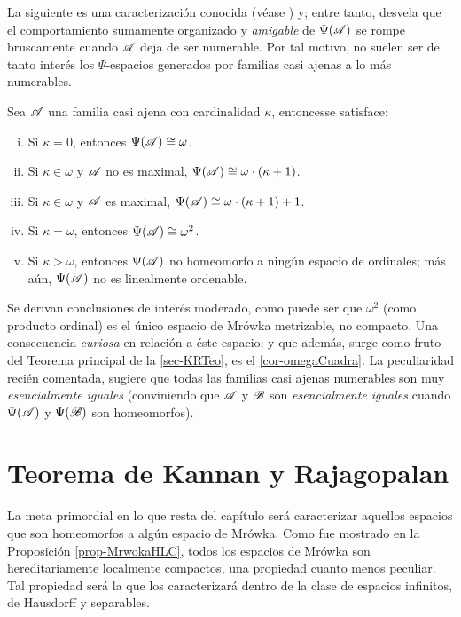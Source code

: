  La siguiente es una caracterización conocida (véase \cite[p.~39,45]{GeorginaTesis}) y; entre tanto, desvela que el comportamiento sumamente organizado y \textit{amigable} de $\Psi(\mathscr{A})$ se rompe bruscamente cuando $\mathscr{A}$ deja de ser numerable. Por tal motivo, no suelen ser de tanto interés los $\Psi$-espacios generados por familias casi ajenas a lo más numerables.

 \begin{proposicion}\label{prop-alomasNumCaract}
  Sea $\mathscr{A}$ una familia casi ajena con cardinalidad $\kappa$, entonces\footnotemark se satisface:
  \begin{enumerate}[i)]
   \item Si $\kappa=0$, entonces $\Psi(\mathscr{A}) \cong \omega$.
   \item Si $\kappa \in \omega$ y $\mathscr{A}$ no es maximal, $\Psi(\mathscr{A}) \cong \omega \cdot (\kappa+1)$.
   \item Si $\kappa \in \omega$ y $\mathscr{A}$ es maximal, $\Psi(\mathscr{A}) \cong \omega \cdot (\kappa+1)+1$.
   \item Si $\kappa=\omega$, entonces $\Psi(\mathscr{A}) \cong \omega^2$.
   \item Si $\kappa>\omega$, entonces $\Psi(\mathscr{A})$ no homeomorfo a ningún espacio de ordinales; más aún, $\Psi(\mathscr{A})$ no es linealmente ordenable.
  \end{enumerate}
 \end{proposicion}

 
 Se derivan conclusiones de interés moderado, como puede ser que $\omega^2$ (como producto ordinal) es el único espacio de Mrówka metrizable, no compacto. Una consecuencia \textit{curiosa} en relación a éste espacio; y que además, surge como fruto del Teorema principal de la \autoref{sec-KRTeo}, es el \autoref{cor-omegaCuadra}.
 \label{Dif-esencial}
 La peculiaridad recién comentada, sugiere que todas las familias casi ajenas numerables son muy \textit{esencialmente iguales} (conviniendo que $\mathscr{A}$ y $\mathscr{B}$ son \textit{esencialmente iguales} cuando $\Psi(\mathscr{A})$ y $\Psi(\mathscr{B})$ son homeomorfos).

 \section{Teorema de Kannan y Rajagopalan}
 \label{sec-KRTeo}
 La meta primordial en lo que resta del capítulo será caracterizar aquellos espacios que son homeomorfos a algún espacio de Mrówka. Como fue mostrado en la Proposición \ref{prop-MrwokaHLC}, todos los espacios de Mrówka son hereditariamente localmente compactos, una propiedad cuanto menos peculiar. Tal propiedad será la que los caracterizará dentro de la clase de espacios infinitos, de Hausdorff y separables. 
 
